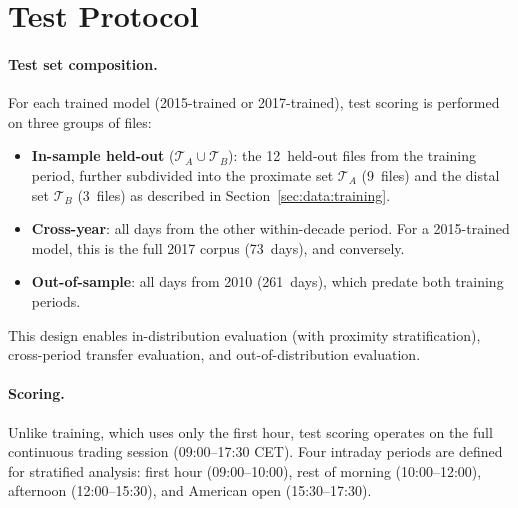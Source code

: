 \documentclass[11pt]{report}
\begin{document}
\section{Test Protocol}\label{sec:data:test}

\paragraph{Test set composition.}
For each trained model (2015-trained or 2017-trained), test scoring is performed on three groups of files:
\begin{itemize}
  \item \textbf{In-sample held-out} ($\mathcal{T}_A \cup \mathcal{T}_B$): the 12~held-out files from the training period, further subdivided into the proximate set $\mathcal{T}_A$ (9~files) and the distal set $\mathcal{T}_B$ (3~files) as described in Section~\ref{sec:data:training}.
  \item \textbf{Cross-year}: all days from the other within-decade period. For a 2015-trained model, this is the full 2017 corpus (73~days), and conversely.
  \item \textbf{Out-of-sample}: all days from 2010 (261~days), which predate both training periods.
\end{itemize}
This design enables in-distribution evaluation (with proximity stratification), cross-period transfer evaluation, and out-of-distribution evaluation.

\paragraph{Scoring.}
Unlike training, which uses only the first hour, test scoring operates on the full continuous trading session (09:00--17:30 CET). Four intraday periods are defined for stratified analysis: first hour (09:00--10:00), rest of morning (10:00--12:00), afternoon (12:00--15:30), and American open (15:30--17:30).
\end{document}
